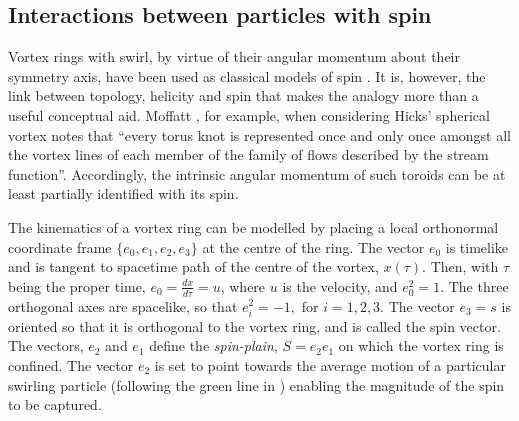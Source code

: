\subsection{Interactions between particles with spin}\label{sec:spin}
Vortex rings with swirl,
by virtue of their angular momentum about their symmetry axis, have been used as  classical models of spin \cite{Pekeris1953}.
It is, however, the link between topology, helicity and spin that makes the analogy more than a useful conceptual aid.
Moffatt \cite{Moffatt1969}, for example, when considering Hicks' spherical vortex notes  that 
``every torus knot is represented once and only once amongst all the vortex lines of each member of the family of flows described by the stream function''.
Accordingly, the intrinsic angular momentum of such toroids 
can be at least partially identified with its spin.


The kinematics of a vortex ring can be modelled by placing a local orthonormal coordinate frame $\{e_0, e_1, e_2, e_3\}$ at the centre of the ring.
The vector $e_0$ is timelike and is tangent to spacetime path of the centre of the vortex, $x(\tau)$.
Then, with $\tau$ being the proper time, $e_0 = \frac{dx}{d\tau} = u$, where $u$ is the velocity, and $e_0^2 = 1$.
The three orthogonal axes are spacelike, so that $e_i^2 = -1,$ for $i = 1,2,3$.
The vector $e_3 = s$ is oriented so that it is  orthogonal to the vortex ring, and is called the spin vector.
The vectors, $e_2$ and $e_1$ define the {\em spin-plain}, $S = e_2e_1$ on which the vortex ring is confined.
The vector $e_2$ is set to point towards the average motion of a particular swirling particle (following the green line in  )
enabling the magnitude of the spin to be captured.


